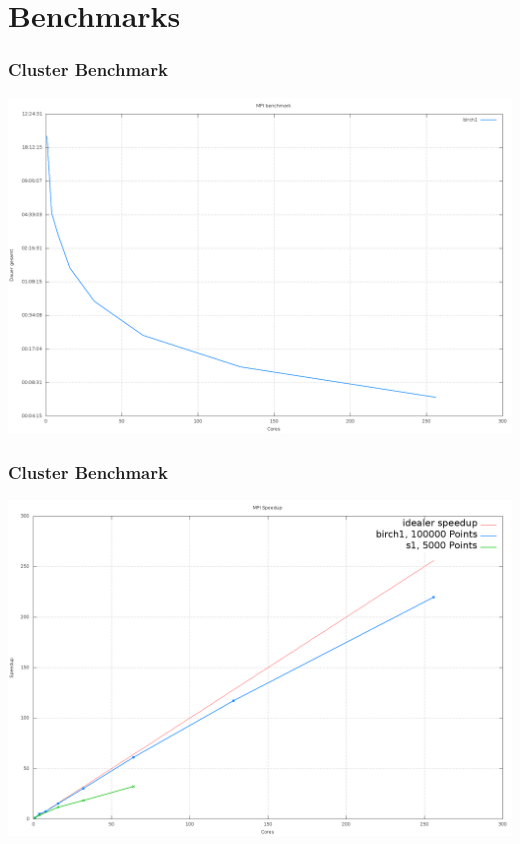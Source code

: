 \documentclass[10pt]{beamer}
\begin{document}
\section{Benchmarks}
\begin{frame}
	\frametitle{Cluster Benchmark}
	\includegraphics[scale=0.25, keepaspectratio]{../output/pics/benchmark.png}
\end{frame}

\begin{frame}
	\frametitle{Cluster Benchmark}
	\includegraphics[scale=0.25, keepaspectratio]{../output/pics/speedup.png}
\end{frame}
\end{document}

